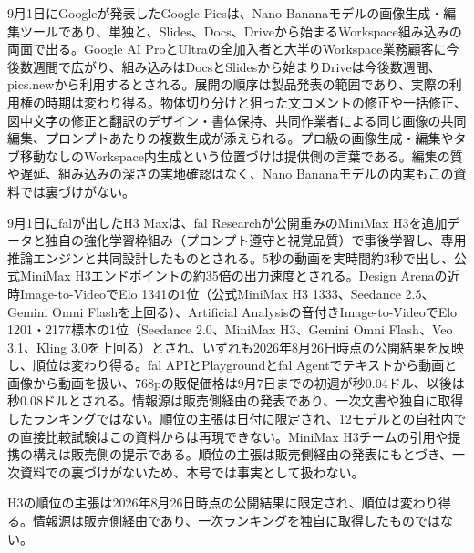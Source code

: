 9月1日にGoogleが発表したGoogle Picsは、Nano Bananaモデルの画像生成・編集ツールであり、単独と、Slides、Docs、Driveから始まるWorkspace組み込みの両面で出る\cite{pics}。Google AI ProとUltraの全加入者と大半のWorkspace業務顧客に今後数週間で広がり、組み込みはDocsとSlidesから始まりDriveは今後数週間、pics.newから利用するとされる。展開の順序は製品発表の範囲であり、実際の利用権の時期は変わり得る。物体切り分けと狙った文コメントの修正や一括修正、図中文字の修正と翻訳のデザイン・書体保持、共同作業者による同じ画像の共同編集、プロンプトあたりの複数生成が添えられる。プロ級の画像生成・編集やタブ移動なしのWorkspace内生成という位置づけは提供側の言葉である。編集の質や遅延、組み込みの深さの実地確認はなく、Nano Bananaモデルの内実もこの資料では裏づけがない。

9月1日にfalが出したH3 Maxは、fal Researchが公開重みのMiniMax H3を追加データと独自の強化学習枠組み（プロンプト遵守と視覚品質）で事後学習し、専用推論エンジンと共同設計したものとされる\cite{h3max}。5秒の動画を実時間約3秒で出し、公式MiniMax H3エンドポイントの約35倍の出力速度とされる。Design Arenaの近時Image-to-VideoでElo 1341の1位（公式MiniMax H3 1333、Seedance 2.5、Gemini Omni Flashを上回る）、Artificial Analysisの音付きImage-to-VideoでElo 1201・2177標本の1位（Seedance 2.0、MiniMax H3、Gemini Omni Flash、Veo 3.1、Kling 3.0を上回る）とされ、いずれも2026年8月26日時点の公開結果を反映し、順位は変わり得る。fal APIとPlaygroundとfal Agentでテキストから動画と画像から動画を扱い、768pの販促価格は9月7日までの初週が秒0.04ドル、以後は秒0.08ドルとされる。情報源は販売側経由の発表であり、一次文書や独自に取得したランキングではない。順位の主張は日付に限定され、12モデルとの自社内での直接比較試験はこの資料からは再現できない。MiniMax H3チームの引用や提携の構えは販売側の提示である。順位の主張は販売側経由の発表にもとづき、一次資料での裏づけがないため、本号では事実として扱わない。

\begin{technicalnote}[日付に限定された順位]
H3の順位の主張は2026年8月26日時点の公開結果に限定され、順位は変わり得る。情報源は販売側経由であり、一次ランキングを独自に取得したものではない\cite{h3max}。
\end{technicalnote}

